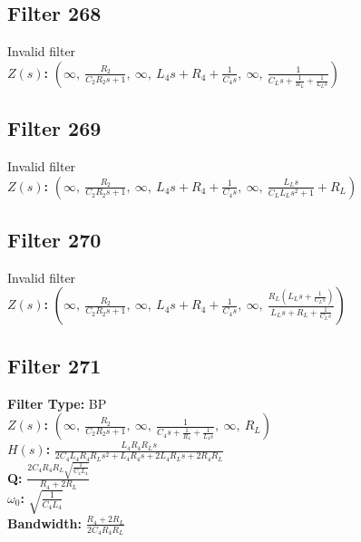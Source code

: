 \documentclass{article}
\begin{document}
\subsection*{Filter 268}
Invalid filter \\ 
\textbf{$Z(s)$:} $\left( \infty, \  \frac{R_{2}}{C_{2} R_{2} s + 1}, \  \infty, \  L_{4} s + R_{4} + \frac{1}{C_{4} s}, \  \infty, \  \frac{1}{C_{L} s + \frac{1}{R_{L}} + \frac{1}{L_{L} s}}\right)$ \\ 
\subsection*{Filter 269}
Invalid filter \\ 
\textbf{$Z(s)$:} $\left( \infty, \  \frac{R_{2}}{C_{2} R_{2} s + 1}, \  \infty, \  L_{4} s + R_{4} + \frac{1}{C_{4} s}, \  \infty, \  \frac{L_{L} s}{C_{L} L_{L} s^{2} + 1} + R_{L}\right)$ \\ 
\subsection*{Filter 270}
Invalid filter \\ 
\textbf{$Z(s)$:} $\left( \infty, \  \frac{R_{2}}{C_{2} R_{2} s + 1}, \  \infty, \  L_{4} s + R_{4} + \frac{1}{C_{4} s}, \  \infty, \  \frac{R_{L} \left(L_{L} s + \frac{1}{C_{L} s}\right)}{L_{L} s + R_{L} + \frac{1}{C_{L} s}}\right)$ \\ 
\subsection*{Filter 271}
\textbf{Filter Type:} BP \\ 
\textbf{$Z(s)$:} $\left( \infty, \  \frac{R_{2}}{C_{2} R_{2} s + 1}, \  \infty, \  \frac{1}{C_{4} s + \frac{1}{R_{4}} + \frac{1}{L_{4} s}}, \  \infty, \  R_{L}\right)$ \\ 
\textbf{$H(s)$:} $\frac{L_{4} R_{4} R_{L} s}{2 C_{4} L_{4} R_{4} R_{L} s^{2} + L_{4} R_{4} s + 2 L_{4} R_{L} s + 2 R_{4} R_{L}}$ \\ 
\textbf{Q:} $\frac{2 C_{4} R_{4} R_{L} \sqrt{\frac{1}{C_{4} L_{4}}}}{R_{4} + 2 R_{L}}$ \\ 
\textbf{$\omega_0$:} $\sqrt{\frac{1}{C_{4} L_{4}}}$ \\ 
\textbf{Bandwidth:} $\frac{R_{4} + 2 R_{L}}{2 C_{4} R_{4} R_{L}}$ \\ 
\end{document}
